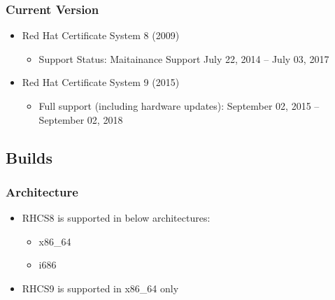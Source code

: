 \documentclass[a4paper]{article}
\begin{document}
    \subsubsection{Current Version}
        \begin{itemize}
            \item Red Hat Certificate System 8 (2009) 
                \begin{itemize}
                    \item Support Status: Maitainance Support July 22, 2014 – July 03, 2017 
                \end{itemize}
            \item Red Hat Certificate System 9 (2015)
                \begin{itemize}
                    \item Full support (including hardware updates): September 02, 2015 – September 02, 2018
                \end{itemize}
        \end{itemize}
\subsection{Builds}
    \subsubsection{Architecture}
        \begin{itemize}
            \item RHCS8 is supported in below architectures:
                \begin{itemize}
                    \item x86\_64
                    \item i686
                \end{itemize}
            \item RHCS9 is supported in x86\_64 only
        \end{itemize}
\end{document}
